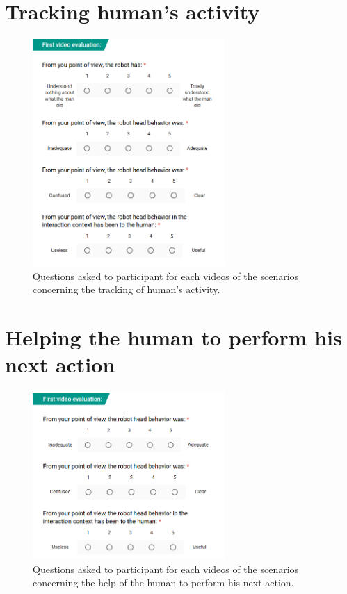 \newpage
\section{Tracking human's activity}


\begin{figure}[!h]
	\centering
    \includegraphics[width=0.65\textwidth]{figs/Chapter6/QuestionsSce2.png}
    \caption{Questions asked to participant for each videos of the scenarios concerning the tracking of human's activity.}
    \label{fig:QuestionsSce2}
\end{figure}

\newpage
\section{Helping the human to perform his next action}

\begin{figure}[!h]
	\centering
    \includegraphics[width=0.65\textwidth]{figs/Chapter6/QuestionsSce4.png}
    \caption{Questions asked to participant for each videos of the scenarios concerning the help of the human to perform his next action.}
    \label{fig:QuestionsSce4}
\end{figure}

